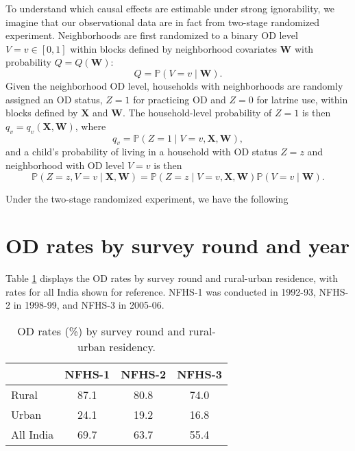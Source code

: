 \documentclass[12pt,a4paper,titlepage]{article}
\begin{document}
\begin{appendices}
To understand which causal effects are estimable under strong ignorability, we imagine that our observational data are in fact from two-stage randomized experiment. Neighborhoods are first randomized to a binary OD level $V = v \in [0,1]$ within blocks defined by neighborhood covariates $\mathbf{W}$ with probability $Q = Q(\mathbf{W})$: 
\begin{equation}\label{eq:Q_def}
	Q = \mathbb{P}(V=v \mid \mathbf{W}).
\end{equation}
Given the neighborhood OD level, households with neighborhoods are randomly assigned an OD status, $Z=1$ for practicing OD and $Z=0$ for latrine use, within blocks defined by $\mathbf{X}$ and $\mathbf{W}$. The household-level probability of $Z=1$ is then $q_v = q_v(\mathbf{X}, \mathbf{W})$, where
\begin{equation}\label{eq:qv_def}
	q_v = \mathbb{P}(Z=1 \mid V=v, \mathbf{X}, \mathbf{W}),
\end{equation}
and a child's probability of living in a household with OD status $Z=z$ and neighborhood with OD level $V=v$ is then
\begin{equation}\label{eq:joint_prob}
	\mathbb{P}(Z=z, V=v \mid \mathbf{X}, \mathbf{W}) = \mathbb{P}(Z=z \mid V=v, \mathbf{X}, \mathbf{W}) \mathbb{P}(V=v \mid\mathbf{W}).
\end{equation}

Under the two-stage randomized experiment, we have the following 

\section{OD rates by survey round and year}\label{sec:od_rates}
Table \ref{table:nfhs_od} displays the OD rates by survey round and rural-urban residence, with rates for all India shown for reference. NFHS-1 was conducted in 1992-93, NFHS-2 in 1998-99, and NFHS-3 in 2005-06.

\begin{table}[h!]
	\small
	\centering
	\begin{tabular}{lccc}
		  & NFHS-1 & NFHS-2 & NFHS-3 \\
		 \hline
		 Rural & 87.1 & 80.8 & 74.0 \\
		 Urban & 24.1 & 19.2 & 16.8 \\
		 All India & 69.7 & 63.7 & 55.4 \\
		 \hline
	\end{tabular}
	\caption{OD rates (\%) by survey round and rural-urban residency.}
	\label{table:nfhs_od}
\end{table}



\end{appendices}
\end{document}
